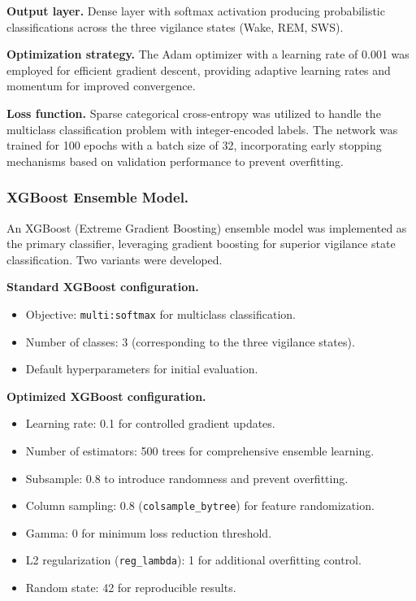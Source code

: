 \documentclass[letterpaper]{article} %
\begin{document}
\textbf{Output layer.} Dense layer with softmax activation producing probabilistic classifications across the three vigilance states (Wake, REM, SWS).

\textbf{Optimization strategy.} The Adam optimizer with a learning rate of 0.001 was employed for efficient gradient descent, providing adaptive learning rates and momentum for improved convergence.

\textbf{Loss function.} Sparse categorical cross-entropy was utilized to handle the multiclass classification problem with integer-encoded labels. The network was trained for 100 epochs with a batch size of 32, incorporating early stopping mechanisms based on validation performance to prevent overfitting.

\subsubsection{XGBoost Ensemble Model.}
An XGBoost (Extreme Gradient Boosting) ensemble model \citep{Chen_2016} was implemented as the primary classifier, leveraging gradient boosting for superior vigilance state classification. Two variants were developed.

\textbf{Standard XGBoost configuration.}
\begin{itemize}\itemsep2pt\parskip0pt
    \item Objective: \texttt{multi:softmax} for multiclass classification.
    \item Number of classes: 3 (corresponding to the three vigilance states).
    \item Default hyperparameters for initial evaluation.
\end{itemize}

\textbf{Optimized XGBoost configuration.}
\begin{itemize}\itemsep2pt\parskip0pt
    \item Learning rate: 0.1 for controlled gradient updates.
    \item Number of estimators: 500 trees for comprehensive ensemble learning.
    \item Subsample: 0.8 to introduce randomness and prevent overfitting.
    \item Column sampling: 0.8 (\texttt{colsample\_bytree}) for feature randomization.
    \item Gamma: 0 for minimum loss reduction threshold.
    \item L2 regularization (\texttt{reg\_lambda}): 1 for additional overfitting control.
    \item Random state: 42 for reproducible results.
\end{itemize}
\end{document}
